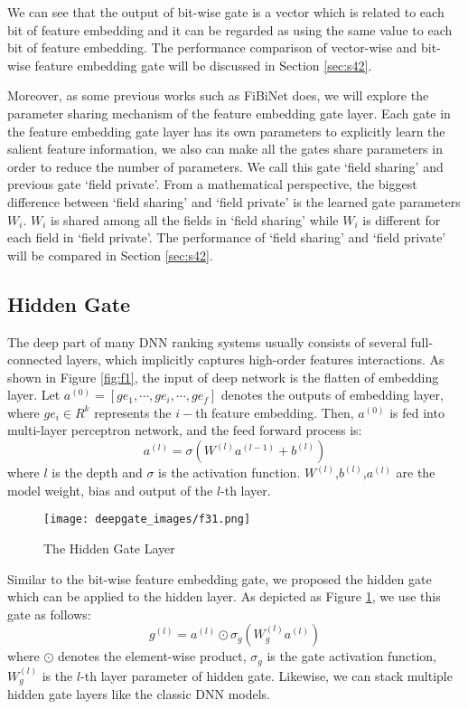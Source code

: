 \documentclass[sigconf,nonacm=true]{acmart}
\begin{document}
We can see that the output of bit-wise gate is a vector which is related to each bit of feature embedding and it can be regarded as using the same value to each bit of feature embedding. The performance comparison of vector-wise and bit-wise feature embedding gate will be discussed in Section \ref{sec:s42}.

Moreover, as some previous works such as FiBiNet\cite{DBLP:conf/recsys/HuangZZ19} does, we will explore the parameter sharing mechanism of the feature embedding gate layer. 
Each gate in the feature embedding gate layer has its own parameters to explicitly learn the salient feature information, 
we also can make all the gates share parameters in order to reduce the number of parameters. 
We call this gate  `field sharing' and previous gate `field private'.
From a mathematical perspective, the biggest difference between `field sharing' and `field private' is the learned gate parameters $W_i$. 
$W_i$ is shared among all the fields in `field sharing' while $W_i$ is different for each field in `field private'.
The performance of `field sharing' and `field private' will be compared in Section \ref{sec:s42}.

\subsection{Hidden Gate}
\label{sec:s35}
The deep part of many DNN ranking systems usually consists of several full-connected layers, which implicitly captures high-order features interactions. 
As shown in Figure \ref{fig:f1}, the input of deep network is the flatten of embedding layer. 
Let $a^{(0)} = [ge_1,\cdots, ge_i, \cdots, ge_f]$ denotes the outputs of embedding layer, where $ge_i \in R^k$ represents the $i-$th feature embedding. 
Then, $a^{(0)}$ is fed into multi-layer perceptron network, and the feed forward process is:
\begin{equation}
    a^{(l)}=\sigma(W^{(l)}a^{(l-1)}+b^{(l)})
\end{equation}
where $l$ is the depth and $\sigma$ is the activation function. $W^{(l)}$,$b^{(l)}$,$a^{(l)}$ are the model weight, bias
and output of the $l$-th layer. 

\begin{figure}[hbt!]
\texttt{[image: deepgate\_images/f31.png]}
  \caption{The Hidden Gate Layer}
  \label{fig:d1}
\end{figure}


Similar to the bit-wise feature embedding gate, we proposed the hidden gate which can be applied to the hidden layer. As depicted as Figure \ref{fig:d1}, we use this gate as follows:
\begin{equation}
  g^{(l)}=a^{(l)} \odot \sigma_g(W_g^{(l)}a^{(l)})
\end{equation}
where $\odot$ denotes the element-wise product, $\sigma_g$ is the gate activation function, $W_g^{(l)}$ is the $l$-th layer parameter of hidden gate. Likewise, we can stack multiple hidden gate layers like the classic DNN models.
\end{document}
